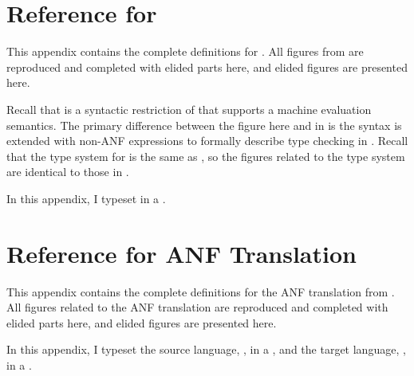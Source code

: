 \chapter{Reference for \anftlang}
\label{chp:anftlang:appendix}
This appendix contains the complete definitions for \anftlang.
All \anftlang figures from  are reproduced and completed with
elided parts here, and elided figures are presented here.

Recall that \anftlang is a syntactic restriction of \slang that supports a
machine evaluation semantics.
The primary difference between the figure here and in  is the
syntax is extended with non-ANF expressions to formally describe type checking
in \anftlang.
Recall that the type system for \anftlang is the same as \slang, so the figures
related to the type system are identical to those in .

\begin{typographical}
  In this appendix, I typeset \anftlang in a \emph{}.
\end{typographical}

\begingroup
\let\label\discard

\FigECCASyntaxE[ht]

\endgroup

\begingroup
\let\scolor\tcolor
\let\sfont\tfont
\let\sfontsym\tfontsym
\let\label\discard
\renewcommand{\slang}{\anftlang}

\FigECCRed[ht]
\FigECCConvFull[ht]
\FigECCEqv[ht]
\FigECCSub[ht]
\FigECCTyping[ht]

\endgroup

\begingroup
\renewcommand{\tA}{\tMin{A}}
\renewcommand{\tB}{\tMin{B}}
\let\label\discard

\FigECCAHetero[ht]
\FigECCAStackTypes[ht]
\FigStackExports[ht]

\endgroup

\begingroup
\let\label\discard
\renewcommand{\se}{\tM}
\renewcommand{\slenv}{\tlenv}
\renewcommand{\slang}{\anftlang}
\renewcommand{\sboolty}{\tboolty}

\FigECCProg[ht]
\FigECCAObs[ht]

\FigECCARed[ht]
\FigECCALinking[ht]
\endgroup

\cleardoublepage
\chapter{Reference for {{ANF}} Translation}
This appendix contains the complete definitions for the ANF translation from
.
All figures related to the ANF translation are reproduced and completed with
elided parts here, and elided figures are presented here.

\begin{typographical}
  In this appendix, I typeset the source language, \anfslang, in a
  \emph{}, and the target language,
  \anftlang, in a \emph{}.
\end{typographical}

\begingroup
\let\label\discard

\FigANFObsRel[ht]
\FigTrans[ht]

\endgroup
